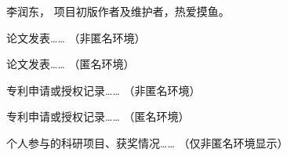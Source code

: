 \documentclass[doctor]{shtthesis}
\makeatletter
\def\ifgraduate{\ifsht@graduate}
\makeatother
\begin{document}
\maketitle

\frontmatter


\makeindices

\ifgraduate

\fi

\mainmatter




\makebiblio

\backmatter


\ifgraduate
\begin{resume}
  李润东，\shtthesis{} 项目初版作者及维护者，热爱摸鱼。
\end{resume}

\begin{publications}
  论文发表…… （非匿名环境）
\end{publications}

\begin{publications*}
  论文发表…… （匿名环境）
\end{publications*}

\begin{patents}
  专利申请或授权记录…… （非匿名环境）
\end{patents}

\begin{patents*}
  专利申请或授权记录…… （匿名环境）
\end{patents*}

\begin{projects}
  个人参与的科研项目、获奖情况…… （仅非匿名环境显示）
\end{projects}
\fi
\end{document}
